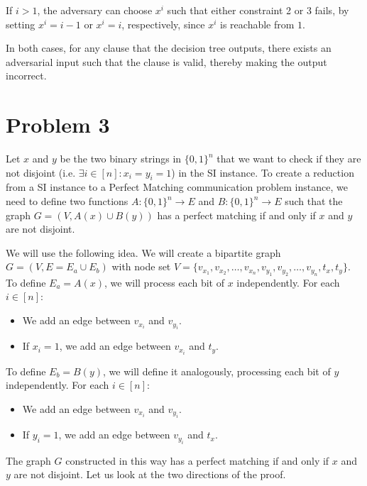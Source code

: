 \documentclass{article}
\begin{document}
If $i > 1$, the adversary can choose $x^i$ such that either constraint 2 or
3 fails, by setting $x^i = i - 1$ or $x^i = i$, respectively, since $x^i$ is
reachable from $1$.

In both cases, for any clause that the decision tree outputs, there exists an
adversarial input such that the clause is valid, thereby making the output
incorrect.

\section*{Problem 3}

Let $x$ and $y$ be the two binary strings in $\{0,1\}^n$ that we want to check if they are not disjoint (i.e. $\exists i \in [n]: x_i = y_i = 1$) in the SI instance. To create a reduction from a SI instance to a Perfect Matching communication problem instance, we need to define two functions $A: \{0,1\}^n \to E$ and $B: \{0,1\}^n \to E$ such that the graph $G=(V,A(x)\cup B(y))$ has a perfect matching if and only if $x$ and $y$ are not disjoint.

We will use the following idea. We will create a bipartite graph $G = (V, E = E_a \cup E_b)$ with node set $V = \{v_{x_1}, v_{x_2}, \ldots, v_{x_n}, v_{y_1}, v_{y_2}, \ldots, v_{y_n}, t_x, t_y\}$. To define $E_a = A(x)$, we will process each bit of $x$ independently. For each $i\in [n]$:

\begin{itemize}
    \item We add an edge between $v_{x_i}$ and $v_{y_i}$.
    \item If $x_i = 1$, we add an edge between $v_{x_i}$ and $t_y$.
\end{itemize}

To define $E_b = B(y)$, we will define it analogously, processing each bit of $y$ independently. For each $i\in [n]$:

\begin{itemize}
    \item We add an edge between $v_{x_i}$ and $v_{y_i}$.
    \item If $y_i = 1$, we add an edge between $v_{y_i}$ and $t_x$.
\end{itemize}

The graph $G$ constructed in this way has a perfect matching if and only if $x$ and $y$ are not disjoint. Let us look at the two directions of the proof.
\end{document}
